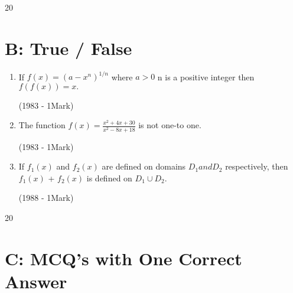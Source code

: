 \documentclass[journal,12pt,twocolumn]{IEEEtran}
\theoremstyle{remark}
\begin{document}
\fontsize{18}
{20}\selectfont
\section{B: True / False}




\begin{enumerate}

\item If $f(x)=(a-x^n)^{1/n}$ where $a>0$ n is a positive integer 
then $f(f(x))=x.$


 \hfill
 {(1983 - 1Mark)}


 
\item The function $f(x)={\frac{x^2+4x+30}{x^2-8x+18}}$ is not one-to one.


\hfill
{(1983 - 1Mark)}




\item If $f{_1}(x)$
 and  $f{_2}(x)$ are  defined on domains $D{_1} and D{_2}$ respectively, then $f{_1}(x)$ + $f{_2}(x)$ is defined on $D{_1}\cup D{_2}$.


\hfill
{(1988 - 1Mark)}
\end{enumerate}


\fontsize{18}
{20}\selectfont
\section{C: MCQ's with One Correct Answer}



 
\end{document}
